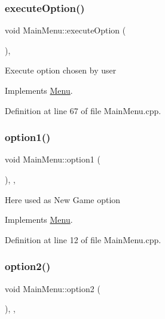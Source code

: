 \subsubsection{\texorpdfstring{execute\+Option()}{executeOption()}}
{\footnotesize\ttfamily void Main\+Menu\+::execute\+Option (\begin{DoxyParamCaption}{ }\end{DoxyParamCaption})\hspace{0.3cm}{\ttfamily [override]}, {\ttfamily [virtual]}}

Execute option chosen by user 

Implements \hyperlink{classMenu}{Menu}.



Definition at line 67 of file Main\+Menu.\+cpp.

\mbox{\label{classMainMenu_a783930d91ab415468d9c631eb61d0a00}} 
\subsubsection{\texorpdfstring{option1()}{option1()}}
{\footnotesize\ttfamily void Main\+Menu\+::option1 (\begin{DoxyParamCaption}{ }\end{DoxyParamCaption})\hspace{0.3cm}{\ttfamily [override]}, {\ttfamily [private]}, {\ttfamily [virtual]}}

Here used as New Game option 

Implements \hyperlink{classMenu}{Menu}.



Definition at line 12 of file Main\+Menu.\+cpp.

\mbox{\label{classMainMenu_a17f6460d8872b2ca269ebcf6eaa82589}} 
\subsubsection{\texorpdfstring{option2()}{option2()}}
{\footnotesize\ttfamily void Main\+Menu\+::option2 (\begin{DoxyParamCaption}{ }\end{DoxyParamCaption})\hspace{0.3cm}{\ttfamily [override]}, {\ttfamily [private]}, {\ttfamily [virtual]}}

